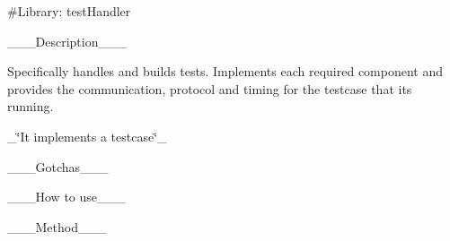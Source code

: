 \#\+Library\+: test\+Handler

\+\_\+\+\_\+\+\_\+\+Description\+\_\+\+\_\+\+\_\+

Specifically handles and builds tests. Implements each required component and provides the communication, protocol and timing for the testcase that it\textquotesingle{}s running.

\+\_\+\char`\"{}\+It implements a testcase\char`\"{}\+\_\+

\+\_\+\+\_\+\+\_\+\+Gotchas\+\_\+\+\_\+\+\_\+

\+\_\+\+\_\+\+\_\+\+How to use\+\_\+\+\_\+\+\_\+

\+\_\+\+\_\+\+\_\+\+Method\+\_\+\+\_\+\+\_\+ 
